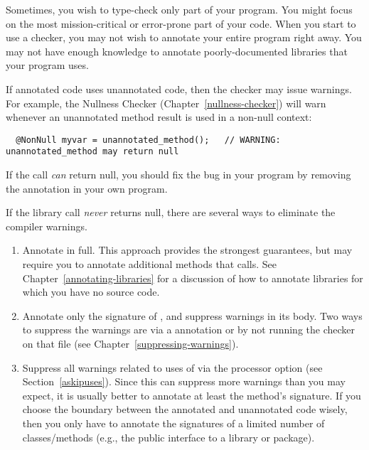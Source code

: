 Sometimes, you wish to type-check only part of your program.
You might focus on the most mission-critical or error-prone part of your
code.  When you start to use a checker, you may not wish to annotate
your entire program right away.
You may not have
enough knowledge to annotate poorly-documented libraries that your program uses.

If annotated code uses unannotated code, then the checker may issue
warnings.  For example, the Nullness Checker (Chapter~\ref{nullness-checker}) will
warn whenever an unannotated method result is used in a non-null context:

\begin{Verbatim}
  @NonNull myvar = unannotated_method();   // WARNING: unannotated_method may return null
\end{Verbatim}

If the call \emph{can} return null, you should fix the bug in your program by
removing the  annotation in your own program.

If the library call \emph{never} returns null,
there are several ways to eliminate the compiler warnings.
\begin{enumerate}
\item Annotate  in full.  This approach provides
  the strongest guarantees, but may require you to annotate additional
  methods that  calls.  See
  Chapter~\ref{annotating-libraries} for a discussion of how to annotate
  libraries for which you have no source code.
\item Annotate only the signature of , and
  suppress warnings in its body.  Two ways to suppress the warnings are via a
   annotation or by not running the checker on that
  file (see Chapter~\ref{suppressing-warnings}).
\item Suppress all warnings related to uses of 
  via the  processor option
  (see Section~\ref{askipuses}).
  Since this can suppress more warnings than you may expect,
  it is usually better to annotate at least the method's signature.  If you
  choose the boundary between the annotated and unannotated code wisely,
  then you only have to annotate the signatures of a limited number of
  classes/methods
  (e.g., the public interface to a library or package).

\end{enumerate}

